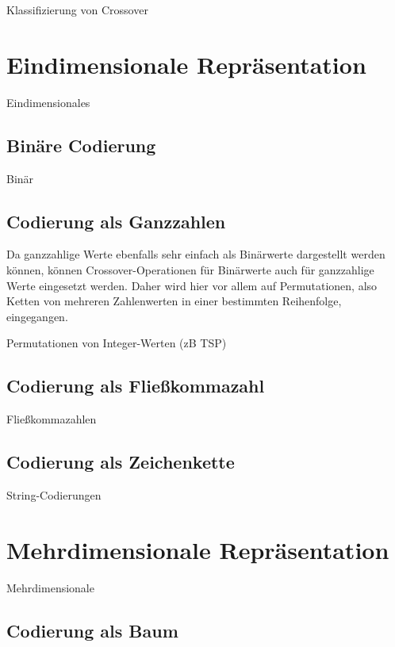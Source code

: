 \documentclass{llncs}
\begin{document}
	Klassifizierung von Crossover

\section{Eindimensionale Repräsentation}
\label{sec:EindimensionaleRep}

Eindimensionales

\subsection{Binäre Codierung}
\label{sec:BinCod}

Binär

\subsection{Codierung als Ganzzahlen}
\label{sec:IntCod}

Da ganzzahlige Werte ebenfalls sehr einfach als Binärwerte dargestellt werden können, können Crossover-Operationen für Binärwerte auch für ganzzahlige Werte eingesetzt werden. Daher wird hier vor allem auf Permutationen, also Ketten von mehreren Zahlenwerten in einer bestimmten Reihenfolge, eingegangen.

Permutationen von Integer-Werten (zB TSP)

\subsection{Codierung als Fließkommazahl}
\label{sec:FloatCod}

Fließkommazahlen

\subsection{Codierung als Zeichenkette}
\label{sec:StrCod}

String-Codierungen

\section{Mehrdimensionale Repräsentation}
\label{sec:MehrdimRep}

Mehrdimensionale

\subsection{Codierung als Baum}
\label{sec:BaumCod}
\end{document}
